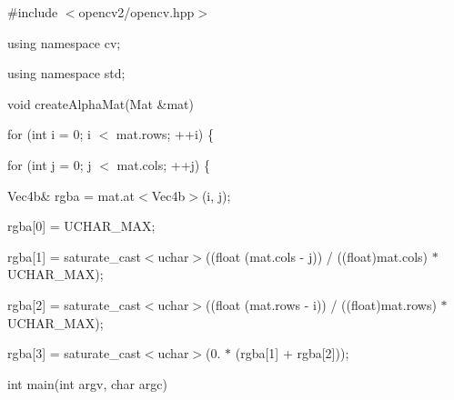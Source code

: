 {\ttfamily }

{\ttfamily }

{\ttfamily \#include $<$opencv2/opencv.\+hpp$>$}

{\ttfamily }

{\ttfamily }

{\ttfamily using namespace cv;}

{\ttfamily }

{\ttfamily }

{\ttfamily using namespace std;}

{\ttfamily }

{\ttfamily }

{\ttfamily void create\+Alpha\+Mat(\+Mat \&mat)}

{\ttfamily }

{\ttfamily }

{\ttfamily for (int i = 0; i $<$ mat.\+rows; ++i) \{}

{\ttfamily }

{\ttfamily }

{\ttfamily for (int j = 0; j $<$ mat.\+cols; ++j) \{}

{\ttfamily }

{\ttfamily }

{\ttfamily Vec4b\& rgba = mat.\+at$<$\+Vec4b$>$(i, j);}

{\ttfamily }

{\ttfamily }

{\ttfamily rgba\mbox{[}0\mbox{]} = U\+C\+H\+A\+R\+\_\+\+M\+AX;}

{\ttfamily }

{\ttfamily }

{\ttfamily rgba\mbox{[}1\mbox{]} = saturate\+\_\+cast$<$uchar$>$((float (mat.\+cols -\/ j)) / ((float)mat.\+cols) $\ast$ U\+C\+H\+A\+R\+\_\+\+M\+AX);}

{\ttfamily }

{\ttfamily }

{\ttfamily rgba\mbox{[}2\mbox{]} = saturate\+\_\+cast$<$uchar$>$((float (mat.\+rows -\/ i)) / ((float)mat.\+rows) $\ast$ U\+C\+H\+A\+R\+\_\+\+M\+AX);}

{\ttfamily }

{\ttfamily }

{\ttfamily rgba\mbox{[}3\mbox{]} = saturate\+\_\+cast$<$uchar$>$(0. $\ast$ (rgba\mbox{[}1\mbox{]} + rgba\mbox{[}2\mbox{]}));}

{\ttfamily }

{\ttfamily }

{\ttfamily int main(int argv, char argc)}

